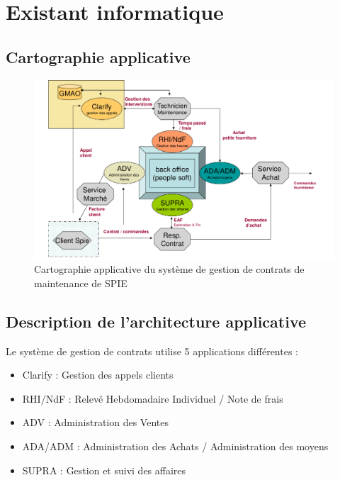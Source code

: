 \section{Existant informatique}

\subsection{Cartographie applicative}

\begin{figure}[h]
    \centering
    \includegraphics[width=140mm]{./images/cartographie_applicative.png}
    \caption{Cartographie applicative du système de gestion de contrats de maintenance de SPIE}
    \label{diagram:carto_app}
\end{figure}

\subsection{Description de l'architecture applicative}

Le système de gestion de contrats utilise 5 applications différentes :


\begin{itemize}
\item Clarify : Gestion des appels clients
\item RHI/NdF : Relevé Hebdomadaire Individuel / Note de frais
\item ADV : Administration des Ventes
\item ADA/ADM : Administration des Achats / Administration des moyens
\item SUPRA : Gestion et suivi des affaires
\end{itemize}


